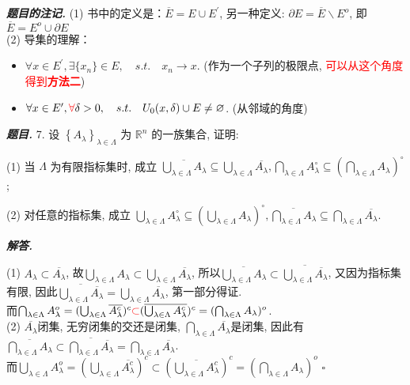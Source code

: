 \documentclass[10pt, a4paper, oneside]{ctexart}
\newenvironment{problem}{\begin{framed}\par\noindent\textbf{\textit{题目. }}}{\end{framed}\par}
\newenvironment{solution}{%
  \par\noindent\textbf{\textit{解答. }}\ignorespaces
}{%
  \hfill\ensuremath{\square}\par %
}
\newenvironment{note}{\par\noindent\textbf{\textit{题目的注记. }}\ignorespaces}{\par}
\begin{document}
\begin{note}
    (1) 书中的定义是：$\overline{E}=E\cup E^{\prime}$, 另一种定义: $\partial E=\overline{E}\backslash E^{o}$, 即$\overline{E}=E^{o}\cup \partial E$\\
    (2) 导集的理解：
    \begin{itemize}
        \item $\forall x\in E^{\prime}, \exists \{x_n\}\in E, \quad s.t. \quad x_n \to x$. (作为一个子列的极限点, \textcolor{red}{可以从这个角度得到\textbf{\textcolor{red}{方法二}}})
        \item $\forall x\in E^{\prime}, \textcolor{red}{\forall} \delta>0, \quad s.t. \quad U_0(x,\delta)\cup E\neq \varnothing$. (从邻域的角度)
    \end{itemize}
\end{note}

\begin{problem}
7. 设 $\left\{A_\lambda\right\}_{\lambda \in \Lambda}$ 为 $\mathbb{R}^n$ 的一族集合, 证明:

(1) 当 $\Lambda$ 为有限指标集时, 成立 $\overline{\bigcup_{\lambda \in \Lambda} A_\lambda} \subseteq \bigcup_{\lambda \in \Lambda} \overline{A_\lambda}, \bigcap_{\lambda \in \Lambda} A_\lambda^{\circ} \subseteq\left(\bigcap_{\lambda \in \Lambda} A_\lambda\right)^{\circ}$;

(2) 对任意的指标集, 成立 $\bigcup_{\lambda \in \Lambda} A_\lambda^{\circ} \subseteq\left(\bigcup_{\lambda \in \Lambda} A_\lambda\right)^{\circ}, \overline{\bigcap_{\lambda \in \Lambda} A_\lambda} \subseteq \bigcap_{\lambda \in \Lambda} \overline{A_\lambda}$.
\end{problem}

\begin{solution}
(1) $A_{\lambda}\subset \overline{A_{\lambda}}$, 故$\bigcup_{\lambda\in \Lambda} A_{\lambda}\subset \bigcup_{\lambda\in \Lambda}\overline{A_{\lambda}}$, 所以$\overline{\bigcup_{\lambda\in \Lambda} A_{\lambda}}\subset \overline{\bigcup_{\lambda\in \Lambda}\overline{A_{\lambda}}}$, 又因为指标集有限, 因此$\overline{\bigcup_{\lambda\in \Lambda}\overline{A_{\lambda}}}=\bigcup_{\lambda\in \Lambda}\overline{A_{\lambda}}$, 第一部分得证.\\
而$\bigcap_{\lambda \in \Lambda}A_{\lambda}^{o}=(\bigcup_{\lambda\in \Lambda} \overline{A_{\lambda}^{c}})^{c}\textcolor{red}{\subset}(\overline{\bigcup_{\lambda\in \Lambda} A_{\lambda}^{c}})^{c}=(\bigcap_{\lambda\in \Lambda}A_{\lambda})^{o}$.\\
(2) $\overline{A_{\lambda}}$闭集, 无穷闭集的交还是闭集, $\bigcap_{\lambda\in \Lambda}\overline{A_{\lambda}}$是闭集, 因此有$\overline{\bigcap_{\lambda\in \Lambda}A_{\lambda}}\subset \overline{\bigcap_{\lambda\in \Lambda}\overline{A_{\lambda}}}=\bigcap_{\lambda\in \Lambda}\overline{A_{\lambda}}$.\\
而$\bigcup_{\lambda\in \Lambda}A_{\lambda}^{o}=(\bigcup_{\lambda\in \Lambda}\overline{A^c_{\lambda}})^{c}\subset (\overline{\bigcup_{\lambda\in \Lambda}A_{\lambda}^c})^c=(\bigcap_{\lambda\in \Lambda}A_{\lambda})^{o}$
\end{solution}
\end{document}
